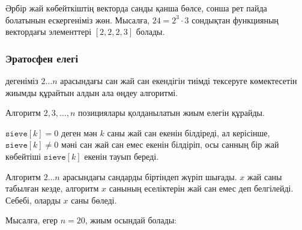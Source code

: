 Әрбір жай көбейткіштің векторда санды қанша бөлсе, 
сонша рет пайда болатынын ескергеніміз жөн.
Мысалға, $24=2^3 \cdot 3$ сондықтан функцияның вектордағы
элементтері $[2,2,2,3]$ болады.

\subsubsection{Эратосфен елегі}


дегеніміз $2 \ldots n$ арасындағы сан жай сан екендігін тиімді тексеруге
көмектесетін жиымды құрайтын алдын ала өңдеу алгоритмі.

Алгоритм $2,3,\ldots,n$ позициялары қолданылатын жиым елегін құрайды.

$\texttt{sieve}[k]=0$ деген мән $k$ саны жай сан екенін
білдіреді, ал керісінше, $\texttt{sieve}[k] \neq 0$ мәні сан жай сан емес
екенін білдіріп, осы санның бір жай көбейтіші $\texttt{sieve}[k]$ екенін
тауып береді.

Алгоритм $2 \ldots n$ арасындағы сандарды
біртіндеп жүріп шығады.
$x$ жай саны табылған кезде, алгоритм $x$ санының
еселіктерін жай сан емес деп белгілейді. Себебі, оларды
$x$ саны бөледі.

Мысалға, егер $n=20$, жиым осындай болады:

